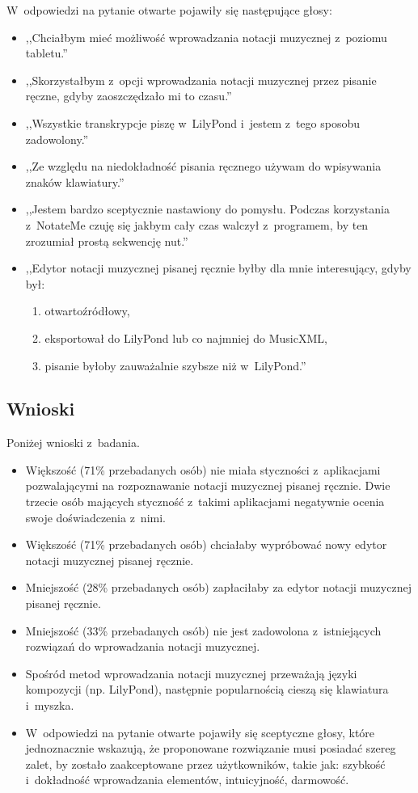 \documentclass[polish,thesis,12pt]{dcsbook}
\begin{document}
W~odpowiedzi na pytanie otwarte pojawiły się następujące głosy:
\begin{itemize}
  \item ,,Chciałbym mieć możliwość wprowadzania notacji muzycznej z~poziomu tabletu.''
  \item ,,Skorzystałbym z~opcji wprowadzania notacji muzycznej przez pisanie ręczne, gdyby zaoszczędzało mi to czasu.''
  \item ,,Wszystkie transkrypcje piszę w~LilyPond i~jestem z~tego sposobu zadowolony.''
  \item ,,Ze względu na niedokładność pisania ręcznego używam do wpisywania znaków klawiatury.''
  \item ,,Jestem bardzo sceptycznie nastawiony do pomysłu. Podczas korzystania z~NotateMe czuję się jakbym cały czas walczył z~programem, by ten zrozumiał prostą sekwencję nut.''
  \item ,,Edytor notacji muzycznej pisanej ręcznie byłby dla mnie interesujący, gdyby był:
        \begin{enumerate}[label=\alph*)]
          \item otwartoźródłowy,
          \item eksportował do LilyPond lub co najmniej do MusicXML,
          \item pisanie byłoby zauważalnie szybsze niż w~LilyPond.''
        \end{enumerate}
\end{itemize}

\subsection{Wnioski}
Poniżej wnioski z~badania.
\begin{itemize}
  \item Większość (71\% przebadanych osób) nie miała styczności z~aplikacjami pozwalającymi na rozpoznawanie notacji muzycznej pisanej ręcznie. Dwie trzecie osób mających styczność z~takimi aplikacjami negatywnie ocenia swoje doświadczenia z~nimi.
  \item Większość (71\% przebadanych osób) chciałaby wypróbować nowy edytor notacji muzycznej pisanej ręcznie.
  \item Mniejszość (28\% przebadanych osób) zapłaciłaby za edytor notacji muzycznej pisanej ręcznie.
  \item Mniejszość (33\% przebadanych osób) nie jest zadowolona z~istniejących rozwiązań do wprowadzania notacji muzycznej.
  \item Spośród metod wprowadzania notacji muzycznej przeważają języki kompozycji (np. LilyPond), następnie popularnością cieszą się klawiatura i~myszka.
  \item W~odpowiedzi na pytanie otwarte pojawiły się sceptyczne głosy, które jednoznacznie wskazują, że proponowane rozwiązanie musi posiadać szereg zalet, by zostało zaakceptowane przez użytkowników, takie jak: szybkość i~dokładność wprowadzania elementów, intuicyjność, darmowość.
\end{itemize}
\end{document}
